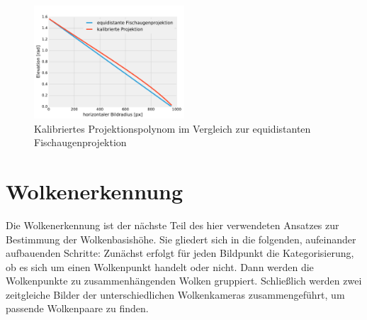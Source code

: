 \documentclass[a4paper,11pt,twoside,german]{article}
\begin{document}
\begin{figure}[!h]
\begin{center}
\vspace{-0.7cm}
\includegraphics[width=0.5\textwidth]{media/projection-calibration.pdf}
\vspace{-0.7cm}
\caption[Kalibrierte Projektionsfunktion]{Kalibriertes Projektionspolynom im
Vergleich zur equidistanten Fischaugenprojektion}
\label{FIGProjektioncalib}
\end{center}
\end{figure}


\section{Wolkenerkennung}
\label{SECWolkenErkennung}
Die Wolkenerkennung ist der nächste Teil des hier verwendeten Ansatzes zur
Bestimmung der Wolkenbasishöhe. Sie gliedert sich in die folgenden, aufeinander
aufbauenden Schritte: Zunächst erfolgt für jeden Bildpunkt die Kategorisierung,
ob es sich um einen Wolkenpunkt handelt oder nicht.  Dann werden die
Wolkenpunkte zu zusammenhängenden Wolken gruppiert. Schließlich werden zwei
zeitgleiche Bilder der unterschiedlichen Wolkenkameras zusammengeführt, um
passende Wolkenpaare zu finden. 
\end{document}
